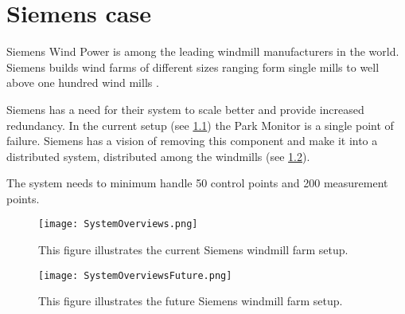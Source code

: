 \chapter{Siemens case}

Siemens Wind Power is among the leading windmill manufacturers in the world. 
Siemens builds wind farms of different sizes ranging form single mills to well above one hundred wind mills \cite{simensOffShoreProjects, simensOnShoreProjects}.

Siemens has a need for their system to scale better and provide increased redundancy.
In the current setup (see \cref{fig:currentSiemensSetup}) the Park Monitor is a single point of failure.
Siemens has a vision of removing this component and make it into a distributed system, distributed among the windmills (see \cref{fig:futureSiemensSetup}).

The system needs to minimum handle 50 control points and 200 measurement points.

\begin{figure}
	\centering
	\texttt{[image: SystemOverviews.png]} 
	\caption[Illustrates the current Siemens windmill farm setup]{
		\label{fig:currentSiemensSetup} 
		\footnotesize{%
			This figure illustrates the current Siemens windmill farm setup.
		}
	}
\end{figure}

\begin{figure}
	\centering
	\texttt{[image: SystemOverviewsFuture.png]} 
	\caption[Illustrates the future Siemens windmill farm setup]{
		\label{fig:futureSiemensSetup} 
		\footnotesize{%
			This figure illustrates the future Siemens windmill farm setup.
		}
	}
\end{figure}
